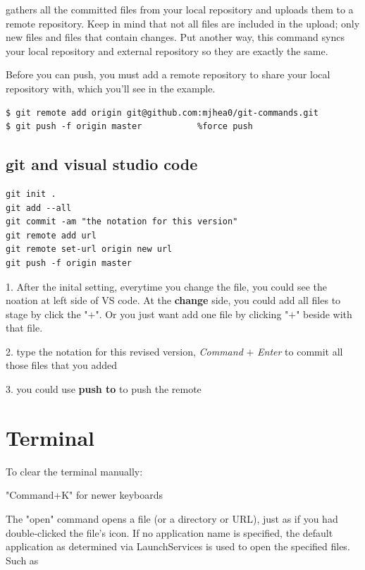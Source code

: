 gathers all the committed files from your local repository and uploads them to a remote repository. Keep in mind that not all files are included in the upload; only new files and files that contain changes. Put another way, this command syncs your local repository and external repository so they are exactly the same.

Before you can push, you must add a remote repository to share your local repository with, which you’ll see in the example.

\begin{verbatim}
$ git remote add origin git@github.com:mjhea0/git-commands.git
$ git push -f origin master           %force push
\end{verbatim}



\subsection{git and visual studio code}

\begin{verbatim}
git init .
git add --all
git commit -am "the notation for this version"
git remote add url
git remote set-url origin new url
git push -f origin master
\end{verbatim}


1. After the inital setting, everytime you change the file, you could see the noation at left side of VS code.  At the \textbf{change} side, you could add all files to stage by click the "$+$". Or you just want add one file by clicking "$+$" beside with that file. 

2. type the notation for this revised version, \textit{Command} $+$ \textit{Enter} to commit all those files that you added

3. you could use \textbf{push to} to push the remote







\section{Terminal}

To clear the terminal manually:


"Command+K"  for newer keyboards


The "open" command opens a file (or a directory or URL), just as if you had double-clicked the file's icon. If no application name is specified, the default application as determined via LaunchServices is used to open the specified files. Such as

